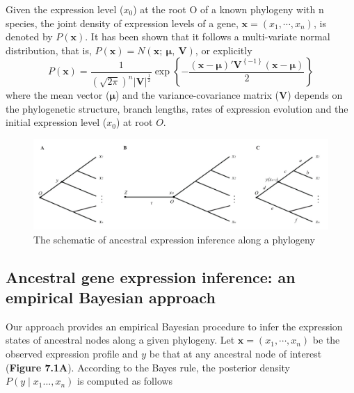 \documentclass[]{book}
\begin{document}
Given the expression level (\(x_0\)) at the root O of a known phylogeny with n species, the joint density of expression levels of a gene, \(\boldsymbol{x}=(x_1,\cdots,x_n)\), is denoted by \(P\left(\boldsymbol{x}\right)\). It has been shown \citep{hansen1996} that it follows a multi-variate normal distribution, that is, \(P\left(\boldsymbol{x}\right)=N\left(\boldsymbol{x};\  \boldsymbol{\mu},\  \boldsymbol{V}\right)\), or explicitly\\
\[P\left(\boldsymbol{x}\right)=\frac{1}{\left(\sqrt{2\pi}\right)^n\left|\boldsymbol{V}\right|^{\frac{1}{2}}}\exp\left\{-\frac{\left(\boldsymbol{x}-\boldsymbol{\mu}\right)'\boldsymbol{V}^{\left\{-1\right\}}\left(\boldsymbol{x}-\boldsymbol{\mu}\right)}{2}\right\}\tag{4.4}\]
where the mean vector (\(\boldsymbol{\mu}\)) and the variance-covariance matrix (\(\boldsymbol{V}\)) depends on the phylogenetic structure, branch lengths, rates of expression evolution and the initial expression level (\(x_0\)) at root \(O\).

\begin{figure}
\includegraphics[width=0.9\linewidth]{Figure3} \caption{The schematic of ancestral expression inference along a phylogeny}\label{fig:unnamed-chunk-34}
\end{figure}

\hypertarget{ancestral-gene-expression-inference-an-empirical-bayesian-approach}{%
\subsection{Ancestral gene expression inference: an empirical Bayesian approach}\label{ancestral-gene-expression-inference-an-empirical-bayesian-approach}}

Our approach provides an empirical Bayesian procedure to infer the expression states of ancestral nodes along a given phylogeny. Let \(\boldsymbol{x}=(x_1,\cdots,x_n)\) be the observed expression profile and \(y\) be that at any ancestral node of interest (\textbf{Figure 7.1A}). According to the Bayes rule, the posterior density \(P\left(y\mid x_1...,x_n\right)\) is computed as follows
\end{document}
